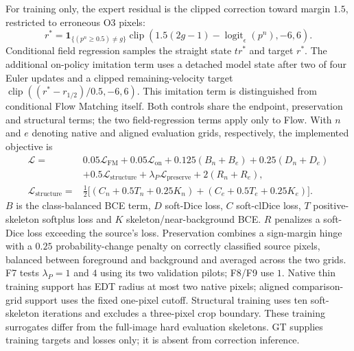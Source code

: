 \documentclass[jimaging,article,submit,pdftex,moreauthors]{Definitions/mdpi}
\begin{document}
For training only, the expert residual is the clipped correction toward
margin $1.5$, restricted to erroneous O3 pixels:
\begin{equation}
r^*=\mathbf{1}_{\{(p^n\geq 0.5)\ne g\}}
\operatorname{clip}\!\left(1.5(2 g-1)-\operatorname{logit}_{\epsilon}(p^n),-6,6\right).
\label{eq:rollout-expert}
\end{equation}
Conditional field regression samples the straight state $t r^*$ and target
$r^*$. The additional on-policy imitation term uses a detached model state
after two of four Euler updates and a clipped remaining-velocity target
$\operatorname{clip}((r^*-r_{1/2})/0.5,-6,6)$. This imitation term is
distinguished from conditional Flow Matching itself. Both controls share the
endpoint, preservation and structural terms; the two field-regression terms
apply only to Flow. With $n$ and $e$ denoting native and aligned evaluation
grids, respectively, the implemented objective is
\begin{equation}
\begin{aligned}
\mathcal{L}={}&0.05\mathcal{L}_{\mathrm{FM}}+0.05\mathcal{L}_{\mathrm{on}}
+0.125(B_n+B_e)+0.25(D_n+D_e)\\
&+0.5\mathcal{L}_{\mathrm{structure}}+\lambda_P\mathcal{L}_{\mathrm{preserve}}
+2(R_n+R_e),\\
\mathcal{L}_{\mathrm{structure}}={}&\tfrac 12\bigl[(C_n+0.5 T_n+0.25 K_n)
+(C_e+0.5 T_e+0.25 K_e)\bigr].
\end{aligned}
\label{eq:rollout-objective}
\end{equation}
$B$ is the class-balanced BCE term, $D$ soft-Dice loss, $C$ soft-clDice loss,
$T$ positive-skeleton softplus loss and $K$ skeleton/near-background BCE.
$R$ penalizes a soft-Dice loss exceeding the source's loss. Preservation
combines a sign-margin hinge with a $0.25$ probability-change penalty on
correctly classified source pixels, balanced between foreground and background
and averaged across the two grids. F7 tests $\lambda_P=1$ and $4$ using its
two validation pilots; F8/F9 use $1$. Native thin training support has EDT
radius at most two native pixels; aligned comparison-grid support uses the
fixed one-pixel cutoff. Structural training uses ten soft-skeleton iterations
and excludes a three-pixel crop boundary. These training surrogates differ
from the full-image hard evaluation skeletons. GT supplies training targets
and losses only; it is absent from correction inference.

\end{document}
